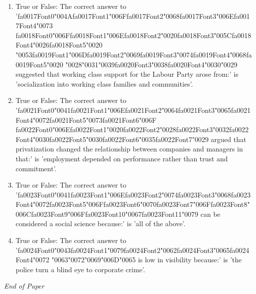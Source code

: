 \documentclass[12pt]{article}
\begin{document}
\begin{enumerate}[label=\arabic*.]
\item True or False: The correct answer to '{\csname fa0017Font0\endcsname\char"004A}{\csname fa0017Font1\endcsname\char"006F}{\csname fa0017Font2\endcsname\char"0068}{\csname fa0017Font3\endcsname\char"006E}{\csname fa0017Font4\endcsname\char"0073} {\csname fa0018Font0\endcsname\char"006F}{\csname fa0018Font1\endcsname\char"006E}{\csname fa0018Font2\endcsname\char"0020}{\csname fa0018Font3\endcsname\char"005C}{\csname fa0018Font4\endcsname\char"0026}{\csname fa0018Font5\endcsname\char"0020} {\char"0053}{\csname fa0019Font1\endcsname\char"006D}{\csname fa0019Font2\endcsname\char"0069}{\csname fa0019Font3\endcsname\char"0074}{\csname fa0019Font4\endcsname\char"0068}{\csname fa0019Font5\endcsname\char"0020} {\char"0028}{\char"0031}{\char"0039}{\csname fa0020Font3\endcsname\char"0038}{\csname fa0020Font4\endcsname\char"0030}{\char"0029} suggested that working class support for the Labour Party arose from:' is 'socialization into working class families and communities'.
\item True or False: The correct answer to '{\csname fa0021Font0\endcsname\char"0041}{\csname fa0021Font1\endcsname\char"006E}{\csname fa0021Font2\endcsname\char"0064}{\csname fa0021Font3\endcsname\char"0065}{\csname fa0021Font4\endcsname\char"0072}{\csname fa0021Font5\endcsname\char"0073}{\csname fa0021Font6\endcsname\char"006F} {\csname fa0022Font0\endcsname\char"006E}{\csname fa0022Font1\endcsname\char"0020}{\csname fa0022Font2\endcsname\char"0028}{\csname fa0022Font3\endcsname\char"0032}{\csname fa0022Font4\endcsname\char"0030}{\csname fa0022Font5\endcsname\char"0030}{\csname fa0022Font6\endcsname\char"0035}{\csname fa0022Font7\endcsname\char"0029} argued that privatization changed the relationship between companies and managers in that:' is 'employment depended on performance rather than trust and commitment'.
\item True or False: The correct answer to '{\csname fa0023Font0\endcsname\char"0041}{\csname fa0023Font1\endcsname\char"006E}{\csname fa0023Font2\endcsname\char"0074}{\csname fa0023Font3\endcsname\char"0068}{\csname fa0023Font4\endcsname\char"0072}{\csname fa0023Font5\endcsname\char"006F}{\csname fa0023Font6\endcsname\char"0070}{\csname fa0023Font7\endcsname\char"006F}{\csname fa0023Font8\endcsname\char"006C}{\csname fa0023Font9\endcsname\char"006F}{\csname fa0023Font10\endcsname\char"0067}{\csname fa0023Font11\endcsname\char"0079} can be considered a social science because:' is 'all of the above'.
\item True or False: The correct answer to '{\csname fa0024Font0\endcsname\char"0043}{\csname fa0024Font1\endcsname\char"0079}{\csname fa0024Font2\endcsname\char"0062}{\csname fa0024Font3\endcsname\char"0065}{\csname fa0024Font4\endcsname\char"0072} {\char"0063}{\char"0072}{\char"0069}{\char"006D}{\char"0065} is low in visibility because:' is 'the police turn a blind eye to corporate crime'.
\end{enumerate}

\vfill
\noindent\textit{End of Paper}
\end{document}
